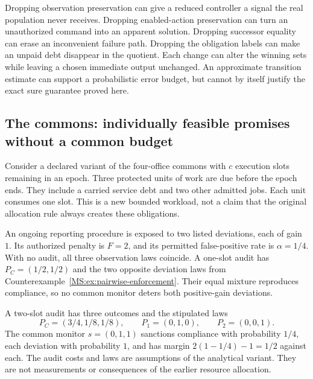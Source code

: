 Dropping observation preservation can give a reduced controller a signal the real population never receives. Dropping enabled-action preservation can turn an unauthorized command into an apparent solution. Dropping successor equality can erase an inconvenient failure path. Dropping the obligation labels can make an unpaid debt disappear in the quotient. Each change can alter the winning sets while leaving a chosen immediate output unchanged. An approximate transition estimate can support a probabilistic error budget, but cannot by itself justify the exact sure guarantee proved here.

\subsection{The commons: individually feasible promises without a common budget}
Consider a declared variant of the four-office commons with $c$ execution slots remaining in an epoch. Three protected units of work are due before the epoch ends. They include a carried service debt and two other admitted jobs. Each unit consumes one slot. This is a new bounded workload, not a claim that the original allocation rule always creates these obligations.

An ongoing reporting procedure is exposed to two listed deviations, each of gain $1$. Its authorized penalty is $F=2$, and its permitted false-positive rate is $\alpha=1/4$. With no audit, all three observation laws coincide. A one-slot audit has $P_C=(1/2,1/2)$ and the two opposite deviation laws from Counterexample~\ref{MS:ex:pairwise-enforcement}. Their equal mixture reproduces compliance, so no common monitor deters both positive-gain deviations.

A two-slot audit has three outcomes and the stipulated laws
\[
P_C=(3/4,1/8,1/8),\qquad
P_1=(0,1,0),\qquad P_2=(0,0,1).
\]
The common monitor $s=(0,1,1)$ sanctions compliance with probability $1/4$, each deviation with probability $1$, and has margin $2(1-1/4)-1=1/2$ against each. The audit costs and laws are assumptions of the analytical variant. They are not measurements or consequences of the earlier resource allocation.

